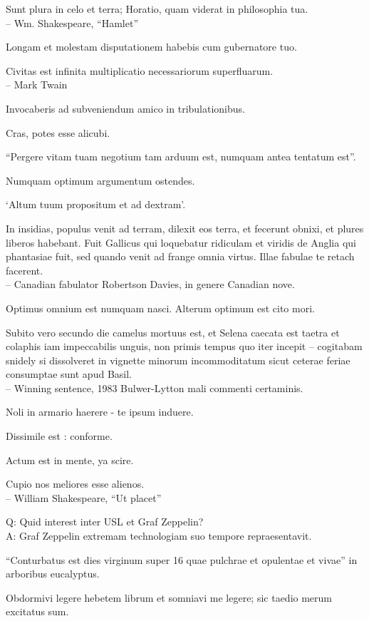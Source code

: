 \documentclass[titlepage,12pt]{memoir}
\begin{document}
Sunt plura in celo et terra;
Horatio, quam viderat in philosophia tua.
\\-- Wm. Shakespeare, “Hamlet”

Longam et molestam disputationem habebis cum gubernatore tuo.

Civitas est infinita multiplicatio necessariorum superfluarum.
\\-- Mark Twain

Invocaberis ad subveniendum amico in tribulationibus.

Cras, potes esse alicubi.

“Pergere vitam tuam negotium tam arduum est, numquam antea tentatum est”.

Numquam optimum argumentum ostendes.

‘Altum tuum propositum et ad dextram’.

In insidias, populus venit ad terram, dilexit eos terra, et fecerunt
obnixi, et plures liberos habebant. Fuit Gallicus qui loquebatur ridiculam
et viridis de Anglia qui phantasiae fuit, sed quando venit ad
frange omnia virtus. Illae fabulae te retach facerent.
\\-- Canadian fabulator Robertson Davies, in genere Canadian
nove.

Optimus omnium est numquam nasci. Alterum optimum est cito mori.

Subito vero secundo die camelus mortuus est, et Selena caecata est
taetra et colaphis iam impeccabilis unguis, non primis
tempus quo iter incepit -- cogitabam snidely si dissolveret
in vignette minorum incommoditatum sicut ceterae feriae consumptae sunt
apud Basil.
\\-- Winning sentence, 1983 Bulwer-Lytton mali commenti certaminis.

Noli in armario haerere - te ipsum induere.

Dissimile est : conforme.

Actum est in mente, ya scire.

 Cupio nos meliores esse alienos.
\\-- William Shakespeare, “Ut placet”

Q: Quid interest inter USL et Graf Zeppelin?\\
A: Graf Zeppelin extremam technologiam suo tempore repraesentavit.

“Conturbatus est dies virginum super 16 quae pulchrae et opulentae et vivae”
in arboribus eucalyptus.

Obdormivi legere hebetem librum et somniavi me legere;
sic taedio merum excitatus sum.
\end{document}
